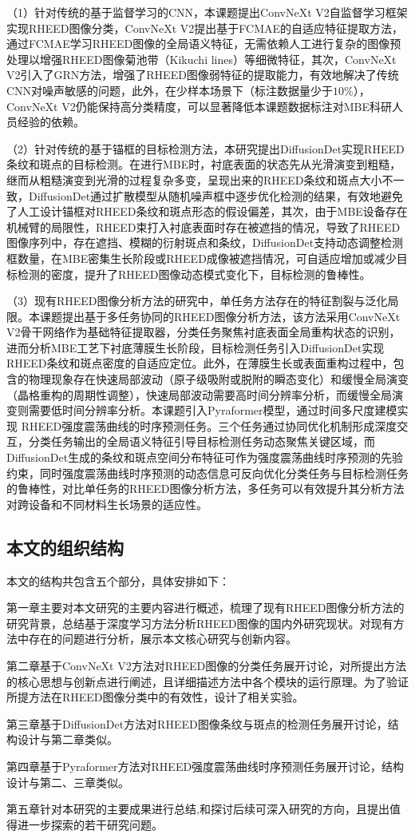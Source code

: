 （1）针对传统的基于监督学习的CNN，本课题提出ConvNeXt V2自监督学习框架实现RHEED图像分类，ConvNeXt V2提出基于FCMAE的自适应特征提取方法，通过FCMAE学习RHEED图像的全局语义特征，无需依赖人工进行复杂的图像预处理以增强RHEED图像菊池带（Kikuchi lines）等细微特征，其次，ConvNeXt V2引入了GRN方法，增强了RHEED图像弱特征的提取能力，有效地解决了传统CNN对噪声敏感的问题，此外，在少样本场景下（标注数据量少于$10\%$），ConvNeXt V2仍能保持高分类精度，可以显著降低本课题数据标注对MBE科研人员经验的依赖。

（2）针对传统的基于锚框的目标检测方法，本研究提出DiffusionDet实现RHEED条纹和斑点的目标检测。在进行MBE时，衬底表面的状态先从光滑演变到粗糙，继而从粗糙演变到光滑的过程复杂多变，呈现出来的RHEED条纹和斑点大小不一致，DiffusionDet通过扩散模型从随机噪声框中逐步优化检测的结果，有效地避免了人工设计锚框对RHEED条纹和斑点形态的假设偏差，其次，由于MBE设备存在机械臂的局限性，RHEED束打入衬底表面时存在被遮挡的情况，导致了RHEED图像序列中，存在遮挡、模糊的衍射斑点和条纹，DiffusionDet支持动态调整检测框数量，在MBE密集生长阶段或RHEED成像被遮挡情况，可自适应增加或减少目标检测的密度，提升了RHEED图像动态模式变化下，目标检测的鲁棒性。

（3）现有RHEED图像分析方法的研究中，单任务方法存在的特征割裂与泛化局限。本课题提出基于多任务协同的RHEED图像分析方法，该方法采用ConvNeXt V2骨干网络作为基础特征提取器，分类任务聚焦衬底表面全局重构状态的识别，进而分析MBE工艺下衬底薄膜生长阶段，目标检测任务引入DiffusionDet实现RHEED条纹和斑点密度的自适应定位。此外，在薄膜生长或表面重构过程中，包含的物理现象存在快速局部波动（原子级吸附或脱附的瞬态变化）和缓慢全局演变（晶格重构的周期性调整），快速局部波动需要高时间分辨率分析，而缓慢全局演变则需要低时间分辨率分析。本课题引入Pyraformer模型，通过时间多尺度建模实现 RHEED强度震荡曲线的时序预测任务。三个任务通过协同优化机制形成深度交互，分类任务输出的全局语义特征引导目标检测任务动态聚焦关键区域，而DiffusionDet生成的条纹和斑点空间分布特征可作为强度震荡曲线时序预测的先验约束，同时强度震荡曲线时序预测的动态信息可反向优化分类任务与目标检测任务的鲁棒性，对比单任务的RHEED图像分析方法，多任务可以有效提升其分析方法对跨设备和不同材料生长场景的适应性。

\subsection{本文的组织结构}
本文的结构共包含五个部分，具体安排如下：

第一章主要对本文研究的主要内容进行概述，梳理了现有RHEED图像分析方法的研究背景，总结基于深度学习方法分析RHEED图像的国内外研究现状。对现有方法中存在的问题进行分析，展示本文核心研究与创新内容。

第二章基于ConvNeXt V2方法对RHEED图像的分类任务展开讨论，对所提出方法的核心思想与创新点进行阐述，且详细描述方法中各个模块的运行原理。为了验证所提方法在RHEED图像分类中的有效性，设计了相关实验。

第三章基于DiffusionDet方法对RHEED图像条纹与斑点的检测任务展开讨论，结构设计与第二章类似。

第四章基于Pyraformer方法对RHEED强度震荡曲线时序预测任务展开讨论，结构设计与第二、三章类似。

第五章针对本研究的主要成果进行总结,和探讨后续可深入研究的方向，且提出值得进一步探索的若干研究问题。


